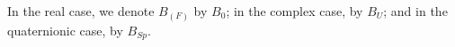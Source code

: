 In the real case, we denote $B_{(F)}$ by $B_0$; in the complex case, by $B_U$; and in the quaternionic case, by $B_{Sp}$.
